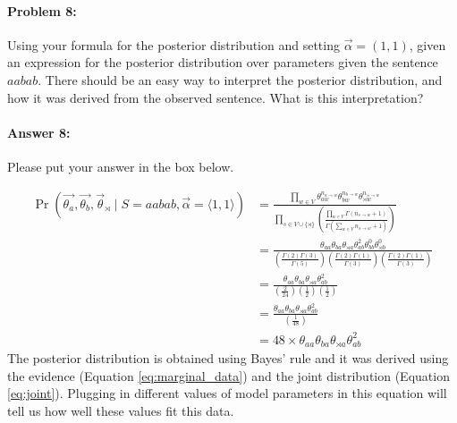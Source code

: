 \documentclass[10pt]{article}
\newenvironment{AnswerBox}{\begin{mdframed}[style=simple]}{\end{mdframed}}
\begin{document}
\hrulefill %

\paragraph{Problem 8:}

Using your formula for the posterior distribution and setting
$\vec{\alpha} = (1,1)$, given an expression for the posterior
distribution over parameters given the sentence $aabab$. There should
be an easy way to interpret the posterior distribution, and how it was
derived from the observed sentence. What is this interpretation?

\paragraph{Answer 8:} Please put your answer in the box below.


\begin{AnswerBox}%

\begin{align*}
    \Pr(\vec{\theta_a}, \vec{\theta_b}, \vec{\theta}_{\rtimes} \mid S =aabab,\vec{\alpha}=\langle 1, 1 \rangle) & = \frac{\prod_{w\in V} \theta_{aw}^{n_{a \rightarrow w}} \theta_{bw}^{n_{b \rightarrow w}} \theta_{\rtimes w}^{n_{\rtimes \rightarrow w}}}{\prod_{s\in V\cup \{\rtimes\}} \left (\frac{\prod_{w\in V} \Gamma (n_{s \rightarrow w}+ 1)}{\Gamma (\sum_{w\in V} n_{s \rightarrow w}+ 1)}\right)}\\
    & =   \frac{\theta_{aa} \theta_{ba} \theta_{\rtimes a} \theta_{ab}^{2} \theta_{bb}^{0} \theta_{\rtimes b}^{0} }{ 
    (\frac{\Gamma (2)\Gamma (3)}{\Gamma (5)})
    (\frac{\Gamma(2)\Gamma (1)}{\Gamma (3)})
    (\frac{\Gamma(2)\Gamma (1)}{\Gamma (3)})}\\
    &= \frac{\theta_{aa} \theta_{ba} \theta_{\rtimes a} \theta_{ab}^{2}}{ 
    (\frac{2}{24})
    (\frac{1}{2})
    (\frac{1}{2})}\\
    &= \frac{\theta_{aa} \theta_{ba} \theta_{\rtimes a} \theta_{ab}^{2}}{ 
    (\frac{1}{48})}\\
    &= 48 \times \theta_{aa} \theta_{ba} \theta_{\rtimes a} \theta_{ab}^{2}
\end{align*}
    The posterior distribution is obtained using Bayes' rule and it was derived using the evidence (Equation \ref{eq:marginal_data}) and the joint distribution (Equation \ref{eq:joint}). Plugging in different values of model parameters in this equation will tell us how well these values fit this data.
\end{AnswerBox}%
\end{document}
